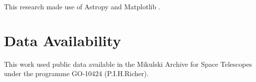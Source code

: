 \documentclass[fleqn,usenatbib,useAMS,letters]{mnras}
\begin{document}
This research made use of Astropy \citep{astropy:2013, astropy:2018} and Matplotlib \citep{matplotlib}.



\section{Data Availability}

This work used public data available in the Mikulski Archive for Space Telescopes under the programme GO-10424 (P.I.H.Richer).










\bsp	%
\label{lastpage}
\end{document}
